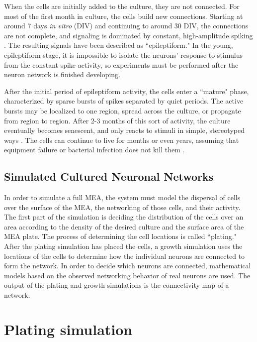 \documentclass[letterpaper]{article}
\begin{document}
When the cells are initially added to the culture, they are not connected. 
For most of the first month in culture, the cells build new connections. 
Starting at around 7 days \emph{in vitro} (DIV) and continuing to around 30 DIV, the connections are not complete, and signaling is dominated by constant, high-amplitude spiking . 
The resulting signals have been described as ``epileptiform."
In the young, epileptiform stage, it is impossible to isolate the neurons' response to stimulus from the constant spike activity, so experiments must be performed after the neuron network is finished developing. 

After the initial period of epileptiform activity, the cells enter a ``mature" phase, characterized by sparse bursts of spikes separated by quiet periods. 
The active bursts may be localized to one region, spread across the culture, or propagate from region to region. 
After 2-3 months of this sort of activity, the culture eventually becomes senescent, and only reacts to stimuli in simple, stereotyped ways \cite{warwick2010controlling}. 
The cells can continue to live for months or even years, assuming that equipment failure or bacterial infection does not kill them \cite{potter2001new}. 

\subsection{Simulated Cultured Neuronal Networks}

In order to simulate a full MEA, the system must model the dispersal of cells over the surface of the MEA, the networking of those cells, and their activity. 
The first part of the simulation is deciding the distribution of the cells over an area according to the density of the desired culture and the surface area of the MEA plate. 
The process of determining the cell locations is called ``plating."
After the plating simulation has placed the cells, a growth simulation uses the locations of the cells to determine how the individual neurons are connected to form the network. 
In order to decide which neurons are connected, mathematical models based on the observed networking behavior of real neurons are used. 
The output of the plating and growth simulations is the connectivity map of a network. 

\section{Plating simulation}
\end{document}
